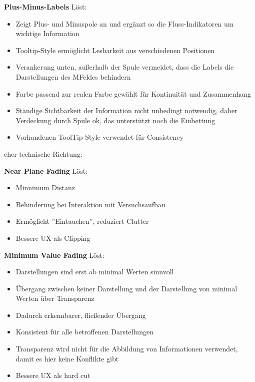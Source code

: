 \textbf{Plus-Minus-Labels}
Löst: 
\begin{itemize}
	\item Zeigt Plus- und Minuspole an und ergänzt so die Fluss-Indikatoren um wichtige Information
	\item Tooltip-Style ermöglicht Lesbarkeit aus verschiedenen Positionen
	\item Verankerung unten, außerhalb der Spule vermeidet, dass die Labels die Darstellungen des MFeldes behindern
	\item Farbe passend zur realen Farbe gewählt für Kontinuität und Zusammenhang
	\item Ständige Sichtbarkeit der Information nicht unbedingt notwendig, daher Verdeckung durch Spule ok, das unterstützt noch die Einbettung
	\item Vorhandenen ToolTip-Style verwendet für Consistency
\end{itemize}
eher technische Richtung:

\textbf{Near Plane Fading}
Löst: 
\begin{itemize}
	\item Minnimum Distanz
	\item Behinderung bei Interaktion mit Versuchsaufbau
	\item Ermöglicht ''Eintauchen'', reduziert Clutter
	\item Bessere UX als Clipping
\end{itemize}

\textbf{Minimum Value Fading}
Löst: 
\begin{itemize}
	\item Darstellungen sind erst ab minimal Werten sinnvoll
	\item Übergang zwischen keiner Darstellung und der Darstellung von minimal Werten über Transparenz
	\item Dadurch erkennbarer, fließender Übergang
	\item Konsistent für alle betroffenen Darstellungen
	\item Transparenz wird nicht für die Abbildung von Informationen verwendet, damit es hier keine Konflikte gibt
	\item Bessere UX als hard cut
\end{itemize}




